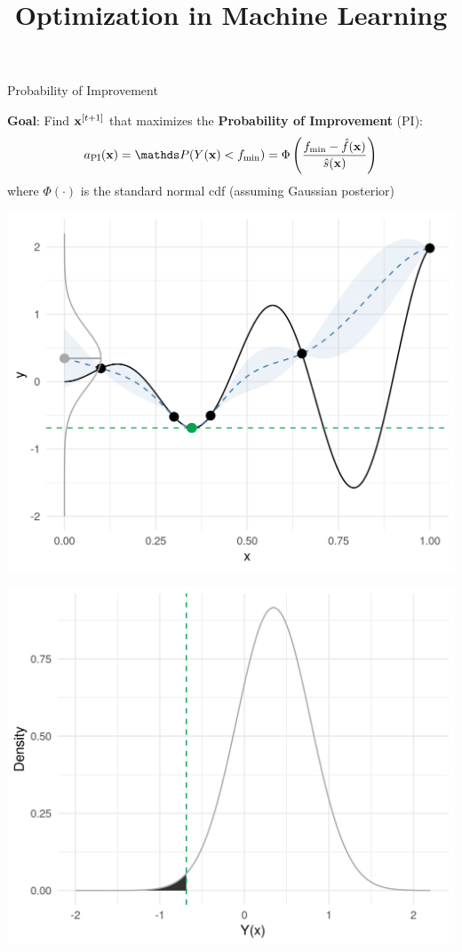 \documentclass[11pt,compress,t,notes=noshow, xcolor=table]{beamer}
\title{Optimization in Machine Learning}
\date{}
\begin{document}

\begin{frame}{Probability of Improvement}

\textbf{Goal}: Find $\mathbf{x}^{[t+1]}$ that maximizes the \textbf{Probability of Improvement} (PI):
$$
  a_{\text{PI}}(\xv) = \P(Y(\xv) < \fmin) = \Phi\left(\frac{\fmin - \fh(\xv)}{\sh(\xv)}\right)
$$
where $\Phi(\cdot)$ is the standard normal cdf (assuming Gaussian posterior) 


 {
\begin{minipage}[b]{0.45\textwidth}
  \includegraphics[width = \textwidth]{figure_man/bayesian_loop_sm_normal_fmin.png}
\end{minipage}
\hfill
\begin{minipage}[b]{0.45\textwidth}
  \includegraphics[width = \textwidth]{figure_man/bayesian_loop_pi_0.png}
\end{minipage}

}
\end{frame}
\end{document}
